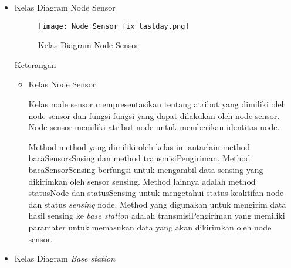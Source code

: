 \begin{itemize}
    \item Kelas Diagram Node Sensor

    \begin{figure}[H]
    	\centering  
    	\texttt{[image: Node\_Sensor\_fix\_lastday.png]}
    	\caption[Kelas Diagram Node Sensor]{Kelas Diagram Node Sensor} 
    	\label{fig:Kelas Diagram Node Sensor} 
    \end{figure}
    
    Keterangan
    \begin{itemize}
        \item Kelas Node Sensor
        
        Kelas node sensor mempresentasikan tentang atribut yang dimiliki oleh node sensor dan fungsi-fungsi yang dapat dilakukan oleh node sensor. Node sensor memiliki atribut node untuk memberikan identitas node. 
        
        Method-method yang dimiliki oleh kelas ini antarlain method bacaSensorsSnsing dan method transmisiPengiriman. Method bacaSensorSensing berfungsi untuk mengambil data sensing yang dikirimkan oleh sensor sensing. Method lainnya adalah method statusNode dan statusSensing untuk mengetahui status keaktifan node dan status \textit{sensing} node. Method yang digunakan untuk mengirim data hasil sensing ke \textit{base station} adalah transmisiPengiriman yang memiliki paramater untuk memasukan data yang akan dikirimkan oleh node sensor. 
        
        
        
        
    \end{itemize}
    
    
    \item Kelas Diagram \textit{Base station}
    

\end{itemize}
